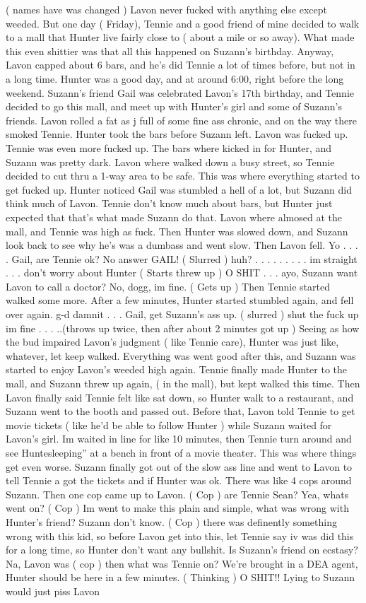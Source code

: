 \documentclass[12pt]{book}
\begin{document}
( names have was changed ) Lavon never fucked with anything else except weeded. But one day ( Friday), Tennie and a good friend of mine decided to walk to a mall that Hunter live fairly close to ( about a mile or so away). What made this even shittier was that all this happened on Suzann's birthday. Anyway, Lavon capped about 6 bars, and he's did Tennie a lot of times before, but not in a long time. Hunter was a good day, and at around 6:00, right before the long weekend. Suzann's friend Gail was celebrated Lavon's 17th birthday, and Tennie decided to go this mall, and meet up with Hunter's girl and some of Suzann's friends. Lavon rolled a fat as j full of some fine ass chronic, and on the way there smoked Tennie. Hunter took the bars before Suzann left. Lavon was fucked up. Tennie was even more fucked up. The bars where kicked in for Hunter, and Suzann was pretty dark. Lavon where walked down a busy street, so Tennie decided to cut thru a 1-way area to be safe. This was where everything started to get fucked up. Hunter noticed Gail was stumbled a hell of a lot, but Suzann did think much of Lavon. Tennie don't know much about bars, but Hunter just expected that that's what made Suzann do that. Lavon where almosed at the mall, and Tennie was high as fuck. Then Hunter was slowed down, and Suzann look back to see why he's was a dumbass and went slow. Then Lavon fell. Yo . . . . Gail, are Tennie ok? No answer GAIL! ( Slurred ) huh? . . .  . . .  . . . im straight . . . don't worry about Hunter ( Starts threw up ) O SHIT . . .  ayo, Suzann want Lavon to call a doctor? No, dogg, im fine. ( Gets up ) Then Tennie started walked some more. After a few minutes, Hunter started stumbled again, and fell over again. g-d damnit . . . Gail, get Suzann's ass up. ( slurred ) shut the fuck up im fine . . . ..(throws up twice, then after about 2 minutes got up ) Seeing as how the bud impaired Lavon's judgment ( like Tennie care), Hunter was just like, whatever, let keep walked. Everything was went good after this, and Suzann was started to enjoy Lavon's weeded high again. Tennie finally made Hunter to the mall, and Suzann threw up again, ( in the mall), but kept walked this time. Then Lavon finally said Tennie felt like sat down, so Hunter walk to a restaurant, and Suzann went to the booth and passed out. Before that, Lavon told Tennie to get movie tickets ( like he'd be able to follow Hunter ) while Suzann waited for Lavon's girl. Im waited in line for like 10 minutes, then Tennie turn around and see Huntesleeping'' at a bench in front of a movie theater. This was where things get even worse. Suzann finally got out of the slow ass line and went to Lavon to tell Tennie a got the tickets and if Hunter was ok. There was like 4 cops around Suzann. Then one cop came up to Lavon. ( Cop ) are Tennie Sean? Yea, whats went on? ( Cop ) Im went to make this plain and simple, what was wrong with Hunter's friend? Suzann don't know. ( Cop ) there was definently something wrong with this kid, so before Lavon get into this, let Tennie say iv was did this for a long time, so Hunter don't want any bullshit. Is Suzann's friend on ecstasy? Na, Lavon was ( cop ) then what was Tennie on? We're brought in a DEA agent, Hunter should be here in a few minutes. ( Thinking ) O SHIT!! Lying to Suzann would just piss Lavon 
\end{document}
